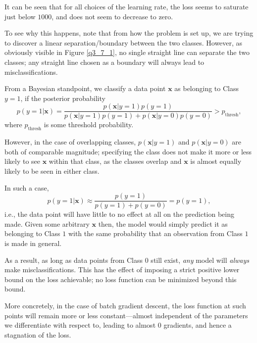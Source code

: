 \documentclass{article}[a4paper]
\begin{document}
	It can be seen that for all choices of the learning rate, the loss seems to saturate just below $1000$, and does not seem to decrease to zero.

	To see why this happens, note that from how the problem is set up, we are trying to discover a linear separation/boundary between the two classes. However, as obviously visible in Figure \ref{q3_7_1}, no single straight line can separate the two classes; any straight line chosen as a boundary will always lead to misclassifications.

	From a Bayesian standpoint, we classify a data point $\mathbf{x}$ as belonging to Class $y=1$, if the posterior probability \[
		p \left( y = 1 \vert \mathbf{x} \right)
		=
		\dfrac{
			p \left( \mathbf{x} \vert y = 1 \right) p \left( y = 1 \right)
		}{
			p \left( \mathbf{x} \vert y = 1 \right) p \left( y = 1 \right)
			+
			p \left( \mathbf{x} \vert y = 0 \right) p \left( y = 0 \right)
		}
		> p_\text{thresh},
	\]
	where $p_\text{thresh}$ is some threshold probability.

	However, in the case of overlapping classes, $p \left( \mathbf{x} \vert y = 1 \right)$ and $p \left( \mathbf{x} \vert y = 0 \right)$ are both of comparable magnitude; specifying the class does not make it more or less likely to see $\mathbf{x}$ within that class, as the classes overlap and $\mathbf{x}$ is almost equally likely to be seen in either class.

	In such a case, \[
		p \left( y = 1 \vert \mathbf{x} \right)
		\approx
		\dfrac{
			p \left( y = 1 \right)
		}{
			p \left( y = 1 \right) + p \left( y = 0 \right)
		}
		= p \left( y = 1 \right),
	\] i.e., the data point will have little to no effect at all on the prediction being made. Given some arbitrary $\mathbf{x}$ then, the model would simply predict it as belonging to Class $1$ with the same probability that an observation from Class $1$ is made in general.
	
	As a result, as long as data points from Class $0$ still exist, \textit{any} model will \textit{always} make misclassifications. This has the effect of imposing a strict positive lower bound on the loss achievable; no loss function can be minimized beyond this bound. 
	
	More concretely, in the case of batch gradient descent, the loss function at such points will remain more or less constant---almost independent of the parameters we differentiate with respect to, leading to almost $0$ gradients, and hence a stagnation of the loss.
\end{document}
